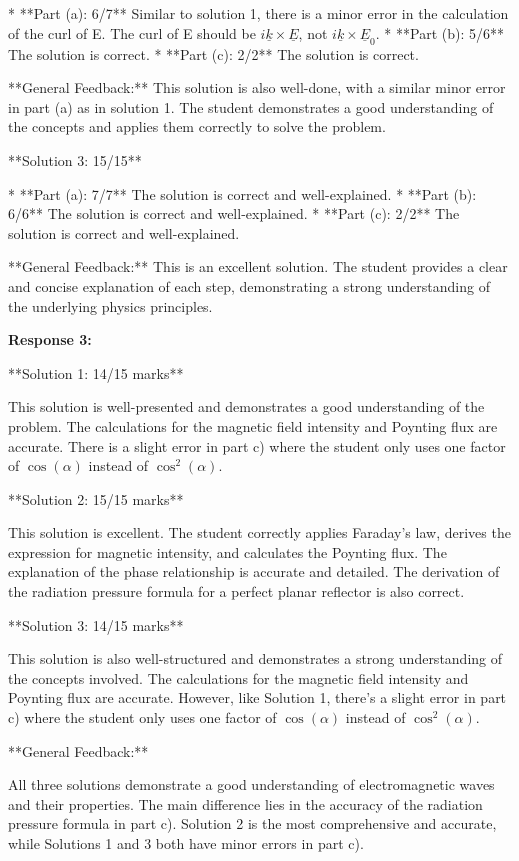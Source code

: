 \documentclass[a4paper,11pt]{article}
\begin{document}
*   **Part (a): 6/7** Similar to solution 1, there is a minor error in the calculation of the curl of E. The curl of E should be \(i\underline{k} \times \underline{E}\), not \(i\underline{k} \times \underline{E}_0\).
*   **Part (b): 5/6** The solution is correct.
*   **Part (c): 2/2** The solution is correct.

**General Feedback:** This solution is also well-done, with a similar minor error in part (a) as in solution 1. The student demonstrates a good understanding of the concepts and applies them correctly to solve the problem.

**Solution 3: 15/15**

*   **Part (a): 7/7** The solution is correct and well-explained.
*   **Part (b): 6/6** The solution is correct and well-explained.
*   **Part (c): 2/2** The solution is correct and well-explained.

**General Feedback:** This is an excellent solution. The student provides a clear and concise explanation of each step, demonstrating a strong understanding of the underlying physics principles.


\textbf{Response 3:}

**Solution 1: 14/15 marks**

This solution is well-presented and demonstrates a good understanding of the problem. The calculations for the magnetic field intensity and Poynting flux are accurate. There is a slight error in part c) where the student only uses one factor of \( \cos(\alpha) \) instead of \( \cos^2(\alpha) \).

**Solution 2: 15/15 marks**

This solution is excellent. The student correctly applies Faraday's law, derives the expression for magnetic intensity, and calculates the Poynting flux. The explanation of the phase relationship is accurate and detailed. The derivation of the radiation pressure formula for a perfect planar reflector is also correct.

**Solution 3: 14/15 marks**

This solution is also well-structured and demonstrates a strong understanding of the concepts involved. The calculations for the magnetic field intensity and Poynting flux are accurate. However, like Solution 1, there's a slight error in part c) where the student only uses one factor of \( \cos(\alpha) \) instead of \( \cos^2(\alpha) \).

**General Feedback:**

All three solutions demonstrate a good understanding of electromagnetic waves and their properties. The main difference lies in the accuracy of the radiation pressure formula in part c). Solution 2 is the most comprehensive and accurate, while Solutions 1 and 3 both have minor errors in part c).
\end{document}
